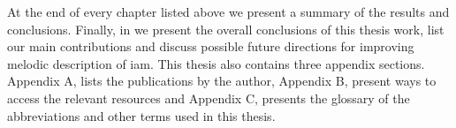 At the end of every chapter listed above we present a summary of the results and conclusions. Finally, in  we present the overall conclusions of this thesis work, list our main contributions and discuss possible future directions for improving melodic description of \gls{iam}. This thesis also contains three appendix sections. Appendix A, lists the publications by the author, Appendix B, present ways to access the relevant resources and Appendix C, presents the glossary of the abbreviations and other terms used in this thesis.














